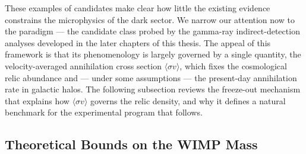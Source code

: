 These examples of candidates make clear how little the existing evidence constrains the microphysics of the dark sector.
We narrow our attention now to the \WIMP paradigm --- the candidate class probed by the gamma-ray indirect-detection analyses developed in the later chapters of this thesis.
The appeal of this framework is that its phenomenology is largely governed by a single quantity, the velocity-averaged annihilation cross section $\langle\sigma v\rangle$, which fixes the cosmological relic abundance and --- under some assumptions --- the present-day annihilation rate in galactic halos.
The following subsection reviews the freeze-out mechanism that explains how $\langle\sigma v\rangle$ governs the relic density, and why it defines a natural benchmark for the experimental program that follows.




\subsection{Theoretical Bounds on the WIMP Mass}
\label{sec:1.2.3}

